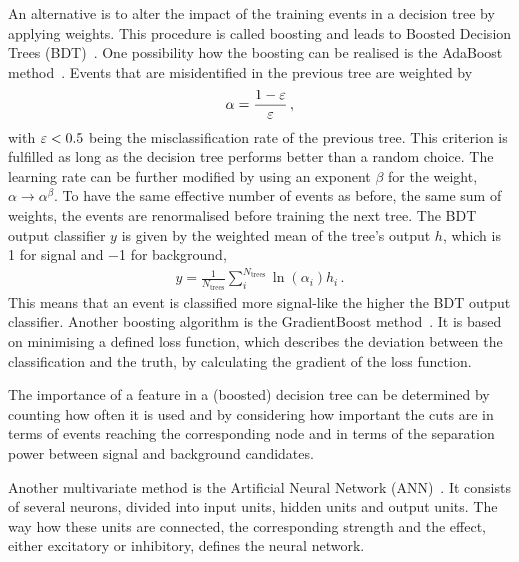 An alternative is to alter the impact of the training events in a decision
tree by applying weights. This procedure is called boosting and leads to
Boosted Decision Trees (BDT)~\cite{Roe}. One possibility how the
boosting can be realised is the AdaBoost method~\cite{AdaBoost}. Events that
are misidentified in the previous tree are weighted by
\begin{align}
	\alpha = \frac{1 - {\varepsilon}}{{\varepsilon}}\,,
\end{align}
with ${\varepsilon} < \num{0.5}$ being the misclassification rate of the previous tree.
This criterion is fulfilled as long as the decision tree performs better than
a random choice. The learning rate can be further modified by using an
exponent $\beta$ for the weight, $\alpha \to \alpha^{\beta}$. To have the same
effective number of events as before, \ie the same sum of weights, the events
are renormalised before training the next tree. The BDT output classifier $y$
is given by the weighted mean of the tree's output $h$, which is \num{+1} for
signal and \num{-1} for background,
\begin{align}
	y = \frac{1}{N_{\textrm{trees}}} \sum_i^{N_{\textrm{trees}}} \ln(\alpha_i) h_i\,.
\end{align}
This means that an event is classified more signal-like the higher the BDT
output classifier. Another boosting algorithm is the GradientBoost
method~\cite{GradientBoost}. It is based on minimising a defined loss
function, which describes the deviation between the classification and the
truth, by calculating the gradient of the loss function.

The importance of a feature in a (boosted) decision tree can be determined by
counting how often it is used and by considering how important the cuts are in
terms of events reaching the corresponding node and in terms of the separation
power between signal and background candidates.

Another multivariate method is the Artificial Neural Network
(ANN)~\cite{Denby:1987rk}. It consists of several neurons, divided into input
units, hidden units and output units. The way how these units are connected,
the corresponding strength and the effect, either excitatory or inhibitory,
defines the neural network.
